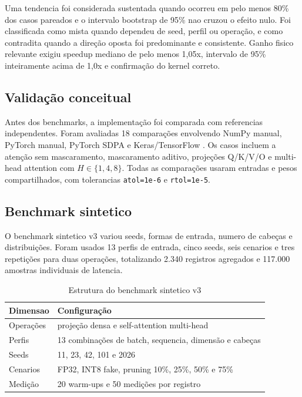 \documentclass[12pt, a4paper]{article}
\begin{document}
Uma tendencia foi considerada sustentada quando ocorreu em pelo menos 80\% dos
casos pareados e o intervalo bootstrap de 95\% nao cruzou o efeito nulo. Foi
classificada como mista quando dependeu de seed, perfil ou opera\c{c}\~ao, e
como contradita quando a dire\c{c}\~ao oposta foi predominante e consistente.
Ganho fisico relevante exigiu speedup mediano de pelo menos 1,05x, intervalo de
95\% inteiramente acima de 1,0x e confirma\c{c}\~ao do kernel correto.

\subsection{Valida\c{c}\~ao conceitual}

Antes dos benchmarks, a implementa\c{c}\~ao foi comparada com referencias
independentes. Foram avaliadas 18 compara\c{c}\~oes envolvendo NumPy manual,
PyTorch manual, PyTorch SDPA e Keras/TensorFlow \cite{paszke2019pytorch,abadi2016tensorflow}.
Os casos incluem a aten\c{c}\~ao sem mascaramento, mascaramento aditivo,
proje\c{c}\~oes Q/K/V/O e multi-head attention com \(H \in \{1,4,8\}\). Todas
as compara\c{c}\~oes usaram entradas e pesos compartilhados, com tolerancias
\texttt{atol=1e-6} e \texttt{rtol=1e-5}.

\subsection{Benchmark sintetico}

O benchmark sintetico v3 variou seeds, formas de entrada, numero de cabe\c{c}as
e distribui\c{c}\~oes. Foram usados 13 perfis de entrada, cinco seeds, seis
cenarios e tres repeti\c{c}\~oes para duas opera\c{c}\~oes, totalizando 2.340
registros agregados e 117.000 amostras individuais de latencia.

\begin{table}[H]
\centering
\caption{Estrutura do benchmark sintetico v3}
\begin{tabular}{ll}
\toprule
\textbf{Dimensao} & \textbf{Configura\c{c}\~ao} \\
\midrule
Opera\c{c}\~oes & proje\c{c}\~ao densa e self-attention multi-head \\
Perfis & 13 combina\c{c}\~oes de batch, sequencia, dimens\~ao e cabe\c{c}as \\
Seeds & 11, 23, 42, 101 e 2026 \\
Cenarios & FP32, INT8 fake, pruning 10\%, 25\%, 50\% e 75\% \\
Medi\c{c}\~ao & 20 warm-ups e 50 medi\c{c}\~oes por registro \\
\bottomrule
\end{tabular}
\end{table}
\end{document}
